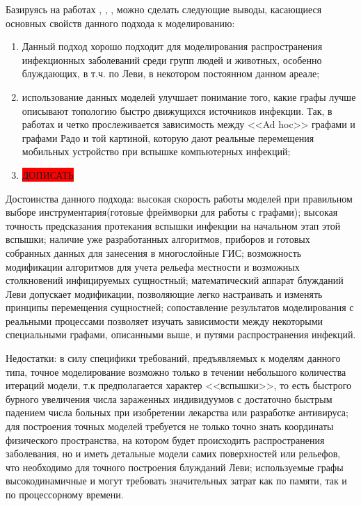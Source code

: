 Базируясь на работах %
,
,
,
можно сделать следующие выводы, касающиеся основных свойств данного подхода к моделированию: 
\begin{enumerate}
	\item Данный подход хорошо подходит для моделирования распространения инфекционных заболеваний среди групп людей и животных, особенно блуждающих, в т.ч. по Леви, в некотором постоянном данном ареале;
	\item использование данных моделей улучшает понимание того, какие графы лучше описывают топологию быстро движущихся источников инфекции. Так, в работах %
	и %
	четко прослеживается зависимость между <<Ad hoc>> графами и графами Радо и той картиной, которую дают реальные перемещения мобильных устройство при вспышке компьютерных инфекций;
	\item \colorbox{red}{ДОПИСАТЬ}
\end{enumerate}


Достоинства данного подхода: высокая скорость работы моделей при правильном выборе инструментария(готовые фреймворки для работы с графами); высокая точность предсказания протекания вспышки инфекции на начальном этап этой вспышки; наличие уже разработанных алгоритмов, приборов и готовых собранных данных для занесения в многослойные ГИС; возможность модификации алгоритмов для учета рельефа местности и возможных столкновений инфицируемых сущностный; математический аппарат блужданий Леви допускает модификации, позволяющие легко настраивать и изменять принципы перемещения сущностней; сопоставление результатов моделирования с реальными процессами позволяет изучать зависимости между некоторыми специальными графами, описанными выше, и путями распространения инфекций. 


Недостатки: в силу специфики требований, предъявляемых к моделям данного типа, точное моделирование возможно только в течении небольшого количества итераций модели, т.к предполагается характер <<вспышки>>, то есть быстрого бурного увеличения числа зараженных индивидуумов с достаточно быстрым падением числа больных при изобретении лекарства или разработке антивируса; для построения точных моделей требуется не только точно знать координаты физического пространства, на котором будет происходить распространения заболевания, но и иметь детальные модели самих поверхностей или рельефов, что необходимо для точного построения блужданий Леви; используемые графы высокодинамичные и могут требовать значительных затрат как по памяти, так и по процессорному времени.